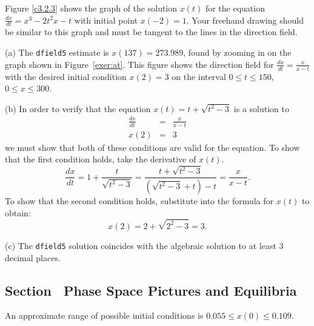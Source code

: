 Figure \ref{c3.2.3} shows the graph of the solution $x(t)$ for the
equation $\frac{dx}{dt} = x^3 - 2t^2x - t$ with initial point $x(-2) = 1$.
Your freehand drawing should be similar to this graph and must be
tangent to the lines in the direction field.

\begin{figure}[htb]
                       \centerline{%
                       }
\end{figure}

(a) The {\tt dfield5} estimate is $x(137) = 273.989$, found by zooming
in on the graph shown in Figure~\ref{exer:at}.  This figure shows the
direction field for $\frac{dx}{dt} = \frac{x}{x - t}$ with the desired
initial condition $x(2) = 3$ on the interval $0 \leq t \leq 150$, $0
\leq x \leq 300$.

(b) In order to verify that the equation $x(t) = t + \sqrt{t^2 - 3}$
is a solution to
\[
\begin{array}{rcl}
\frac{dx}{dt} & = & \frac{x}{x - t} \\
x(2) & = & 3\end{array}
\]
we must show that both of these conditions are valid for the equation.
To show that the first condition holds, take the derivative of $x(t)$.
\[
\frac{dx}{dt} = 1 + \frac{t}{\sqrt{t^2 - 3}} = \frac{t + {\sqrt{t^2 - 
3}}}{\left({\sqrt{t^2 - 3}} + t\right) - t} = \frac{x}{x - t}.
\]
To show that the second condition holds, substitute into the formula for
$x(t)$ to obtain:
\[ x(2) = 2 + \sqrt{2^2 - 3} = 3. \]

(c) The {\tt dfield5} solution coincides with the algebraic solution to at
least 3 decimal places.

\begin{figure}[htb]
                       \centerline{%
                       }
\end{figure}



\subsection*{Section~\protect{\ref{S:PSP&E}} Phase Space Pictures and Equilibria}

\ans An approximate range of possible initial conditions is
$0.055 \leq x(0) \leq 0.109$. 

